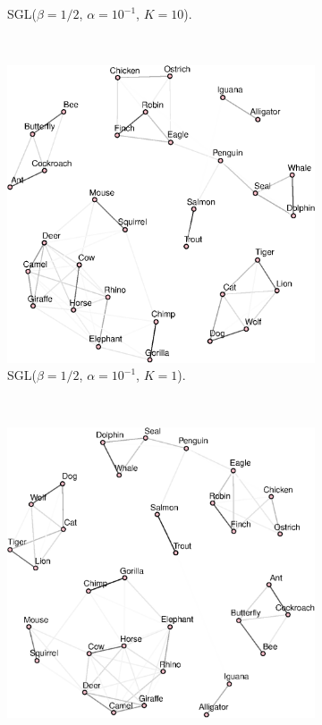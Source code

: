 \begin{figure}[!htb]
\begin{subfigure}[b]{0.475\textwidth}
      \caption{\textsf{SGL}($\beta = 1/2$, $\alpha = 10^{-1}$, $K = 10$).}
    \end{subfigure}\\
    \begin{subfigure}[b]{0.475\textwidth}
      \includegraphics[width=\textwidth]{animals/latex/figures/animals_graph_k1.eps}
      \caption{\textsf{SGL}($\beta = 1/2$, $\alpha = 10^{-1}$, $K = 1$).}
    \end{subfigure}
    ~
    \begin{subfigure}[b]{0.475\textwidth}
      \includegraphics[width=\textwidth]{animals/latex/figures/animals_graph_k4.eps}

\end{subfigure}
\end{figure}
